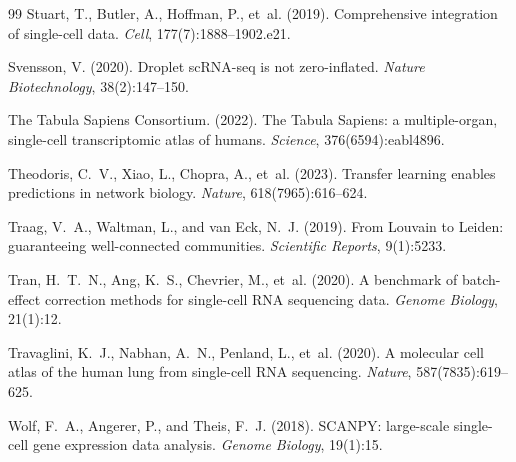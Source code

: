 \documentclass[12pt]{article}
\begin{document}
\begin{thebibliography}{99}
Stuart, T., Butler, A., Hoffman, P., et~al. (2019).
\newblock Comprehensive integration of single-cell data.
\newblock \textit{Cell}, 177(7):1888--1902.e21.

Svensson, V. (2020).
\newblock Droplet scRNA-seq is not zero-inflated.
\newblock \textit{Nature Biotechnology}, 38(2):147--150.

{The Tabula Sapiens Consortium}. (2022).
\newblock The Tabula Sapiens: a multiple-organ, single-cell transcriptomic
  atlas of humans.
\newblock \textit{Science}, 376(6594):eabl4896.

Theodoris, C.~V., Xiao, L., Chopra, A., et~al. (2023).
\newblock Transfer learning enables predictions in network biology.
\newblock \textit{Nature}, 618(7965):616--624.

Traag, V.~A., Waltman, L., and van Eck, N.~J. (2019).
\newblock From Louvain to Leiden: guaranteeing well-connected communities.
\newblock \textit{Scientific Reports}, 9(1):5233.

Tran, H.~T.~N., Ang, K.~S., Chevrier, M., et~al. (2020).
\newblock A benchmark of batch-effect correction methods for single-cell RNA
  sequencing data.
\newblock \textit{Genome Biology}, 21(1):12.

Travaglini, K.~J., Nabhan, A.~N., Penland, L., et~al. (2020).
\newblock A molecular cell atlas of the human lung from single-cell RNA
  sequencing.
\newblock \textit{Nature}, 587(7835):619--625.

Wolf, F.~A., Angerer, P., and Theis, F.~J. (2018).
\newblock SCANPY: large-scale single-cell gene expression data analysis.
\newblock \textit{Genome Biology}, 19(1):15.

\end{thebibliography}
\end{document}
